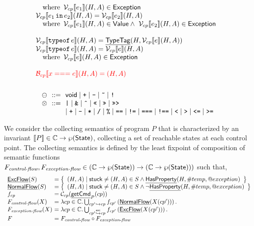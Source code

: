 \documentclass{article}
\makeatletter
\newcommand{\SF}[1]{\mbox{\textsf{#1}}}
\newcommand{\TT}[1]{\mbox{\texttt{#1}}}
\newcommand{\inop}{\ensuremath{\otimes}}
\newcommand{\preop}{\ensuremath{\ominus}}
\newcommand{\cfgnext}{\hookrightarrow}
\newcommand{\excnext}{\stackrel{\mathsf{exc}}{\hookrightarrow}}
\newcommand{\wherec}[1]{{\rm where}\begin{array}[t]{l}#1\end{array}}
\newcommand{\State}{\SF{State}}
\newcommand{\Value}{\SF{Value}}
\newcommand{\N}{\mathcal{C}}
\newcommand{\B}{\mathcal{B}}
\newcommand{\V}{\mathcal{V}}
\newcommand{\set}[1]{\left\{\begin{array}{l}#1\end{array}\right\}}
\newcommand{\powerset}[1]{\wp(#1)}
\newcommand{\controlpoint}{\mathbb{C}}
\newcommand{\lbr}{\llbracket}
\newcommand{\rbr}{\rrbracket}
\newcommand{\hf}[1]{\underline{\sf #1}}
\newcommand{\varloc}[1]{\##1}
\newcommand{\varprop}[1]{@#1}
\def\inred{\color{red}}
\makeatother
\begin{document}
\[\begin{array}{ll}
\quad\wherec{
  \V_{cp}\lbr e_1\rbr(H,A)\in\SF{Exception}
}
\\
\V_{cp}\lbr e_1\,\TT{in}\,e_2 \rbr (H,A)
 = \V_{cp}\lbr e_2\rbr(H,A) \\
\quad\wherec{
  \V_{cp}\lbr e_1\rbr(H,A) \in \Value
  \land\ \V_{cp}\lbr e_2\rbr(H,A)\in\SF{Exception}
}
\\\\
\V_{cp}\lbr \TT{typeof}\,e \rbr (H,A) = \hf{TypeTag}(H,\V_{cp}\lbr e\rbr(H,A))
\\
\V_{cp}\lbr \TT{typeof}\,e \rbr (H,A)
 = \V_{cp}\lbr e\rbr(H,A) \\
\quad\wherec{
  \V_{cp}\lbr e\rbr(H,A)\in\SF{Exception}
}
\\\\
\inred \B_{cp} \lbr x === e\rbr(H,A) = (H,A) \\\\
\end{array}
\]
\[
\begin{array}{l@{~~}r@{~~}ll}

 \preop & ::= & \SF{void}
 \mid \TT{+} \mid \TT{-} \mid \TT{\~} \mid \TT{!} \\
 \inop & ::= &
 \TT{|} \mid \TT{\&} 
               \mid \TT{\^} \mid \TT{<<} \mid \TT{>>} \mid \TT{>>>} \\
& & \mid \TT{+} \mid \TT{-} \mid \TT{*} \mid \TT{/} \mid \TT{\%} \mid \TT{==} \mid \TT{!=} 
               \mid \TT{===} \mid \TT{!==} \mid \TT{<} \mid \TT{>} \mid \TT{<=} \mid \TT{>=} \\

\end{array}
\]

 We consider the collecting semantics of program $P$ that is characterized by an
 invariant $\lbr P\rbr \in \controlpoint \rightarrow \powerset{\State}$,
 collecting a set of reachable states at each control point.
 The collecting semantics is defined by the least fixpoint of composition of 
 semantic functions
 $F_{\textit{control-flow}},F_{\textit{exception-flow}}\in (\controlpoint\rightarrow \powerset{\State})\rightarrow (\controlpoint\rightarrow \powerset{\State}))$
 such that,
\[
\begin{array}{l@{~}l@{}}
\hf{ExcFlow}(S) & = \set{(H,A)\mid \SF{stuck}\neq(H,A)\in S \land \hf{HasProperty}(H,\varloc{temp},\varprop{exception})} \\
\hf{NormalFlow}(S) & = \set{(H,A)\mid \SF{stuck}\neq(H,A)\in S \land \lnot \hf{HasProperty}(H,\varloc{temp},\varprop{exception})} \\
f_{cp} & = \N_{cp}(\hf{getCmd}_P(cp)) \\
F_{\textit{control-flow}}(X)&=\lambda cp\in\controlpoint. \bigcup_{cp'\cfgnext cp}f_{cp'}\left(\hf{NormalFlow}(X(cp'))\right). \\
F_{\textit{exception-flow}}(X)&=\lambda cp\in\controlpoint. \bigcup_{cp'\excnext cp}f_{cp'}\left(\hf{ExcFlow}(X(cp'))\right). \\
F & = F_{\textit{control-flow}} \circ F_{\textit{exception-flow}}
\end{array}
\]
\end{document}
